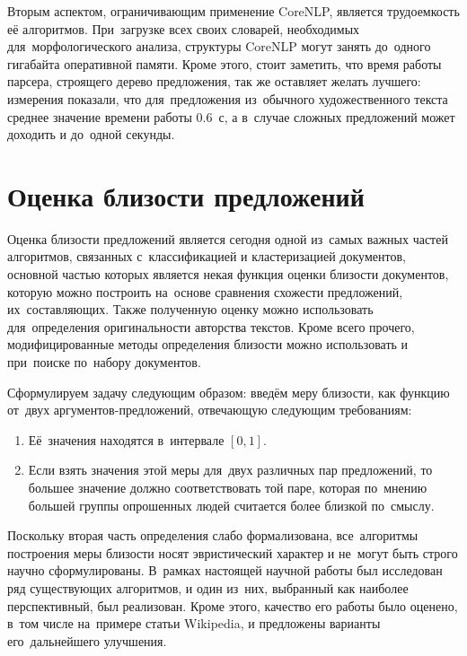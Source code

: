 Вторым аспектом, ограничивающим применение CoreNLP, является трудоемкость её алгоритмов. 
При~загрузке всех своих словарей, необходимых для~морфологического анализа, 
структуры CoreNLP могут занять до~одного гигабайта оперативной памяти.
Кроме этого, стоит заметить, что время работы парсера, строящего дерево предложения,
так же оставляет желать лучшего: измерения показали, что для~предложения
из~обычного художественного текста среднее значение времени работы 0.6~с,
а в~случае сложных предложений может доходить и до~одной секунды.

\section{Оценка близости предложений}

Оценка близости предложений является сегодня одной из~самых важных частей алгоритмов,
 связанных с~классификацией и кластеризацией документов\cite{textminingsurvey}, 
основной частью которых является некая функция оценки близости документов,
которую можно построить на~основе сравнения схожести предложений, их~составляющих.
Также полученную оценку можно использовать для~определения оригинальности
авторства текстов.
Кроме всего прочего, модифицированные методы определения близости можно использовать и при~поиске по~набору документов.

Сформулируем задачу следующим образом:
введём меру близости, как функцию от~двух аргументов-предложений, отвечающую следующим требованиям:

\begin{enumerate}

\item {
Её~значения находятся в~интервале $[0,1]$.
}

\item {
Если взять значения этой меры для~двух различных пар предложений, 
то большее значение должно соответствовать той паре, которая по~мнению большей группы опрошенных людей считается более близкой по~смыслу.
}

\end{enumerate}

Поскольку вторая часть определения слабо формализована, 
все~алгоритмы построения меры близости носят эвристический характер и не~могут быть строго научно сформулированы.
В~рамках настоящей научной работы был исследован ряд существующих алгоритмов,
и один из~них, выбранный как наиболее перспективный, был реализован.
Кроме этого, качество его работы было оценено, в~том числе на~примере статьи Wikipedia, 
и предложены варианты его~дальнейшего улучшения.

